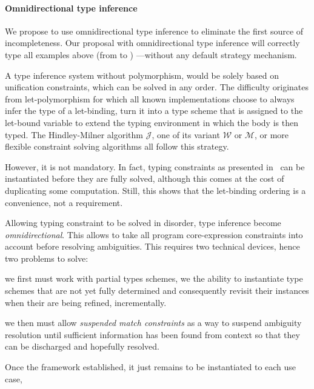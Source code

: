 \documentclass[acmsmall,screen,nonacm]{acmart}
\begin{document}
\paragraph{Omnidirectional type inference}

We propose to use omnidirectional type inference to eliminate the first
source of incompleteness.  Our proposal with omnidirectional type inference
will correctly type all examples above (from  to
)\ignorespaces
{}
---without any default strategy mechanism.

A type inference system without polymorphism, would be solely based on
unification constraints, which can be solved in any order.  The difficulty
originates from \ML let-polymorphism for which all known implementations
choose to always infer the type of a let-binding, turn it into a type scheme
that is assigned to the let-bound variable to extend the typing environment
in which the body is then typed. The Hindley-Milner algorithm $\mathcal{J}$,
one of its variant $\mathcal{W}$ or $\mathcal{M}$, or more flexible
constraint solving algorithms all follow this strategy.

However, it is not mandatory.  In fact, typing constraints as presented
in~\cite {Pottier-Remy/emlti} can be instantiated before they are fully
solved, although this comes at the cost of duplicating some computation.
Still, this shows that the let-binding ordering is a convenience, not a
requirement.

Allowing typing constraint to be solved in disorder, type inference become
\emph{omnidirectional}.  This allows to take all program core-expression
constraints into account before resolving ambiguities.  This requires two
technical devices, hence two problems to solve:
\begin{enumerate*}
\item
  we first must work with partial types schemes, \ie we the ability
  to instantiate type schemes that are not yet fully determined and
  consequently revisit their instances when their are being refined,
  incrementally.
\item
  we then must allow \emph{suspended match constraints} as a way to suspend
  ambiguity resolution until sufficient information has been found from
  context so that they can be discharged and hopefully resolved.

\end{enumerate*}
Once the framework established, it just remains to be instantiated
to each use case,
\end{document}

